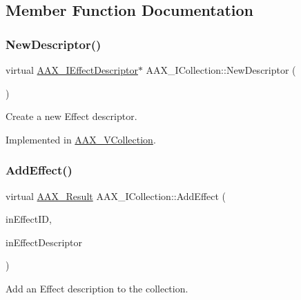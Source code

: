 \subsection{Member Function Documentation}
\mbox{\label{a01777_afab70588134a065a5b4d6ea6ddd5ddff}} 
\subsubsection{\texorpdfstring{NewDescriptor()}{NewDescriptor()}}
{\footnotesize\ttfamily virtual \mbox{\hyperlink{a01813}{A\+A\+X\+\_\+\+I\+Effect\+Descriptor}}$\ast$ A\+A\+X\+\_\+\+I\+Collection\+::\+New\+Descriptor (\begin{DoxyParamCaption}{ }\end{DoxyParamCaption})\hspace{0.3cm}{\ttfamily [pure virtual]}}



Create a new Effect descriptor. 



Implemented in \mbox{\hyperlink{a01897_a4f7845b62f8403ca700706500d54473b}{A\+A\+X\+\_\+\+V\+Collection}}.

\mbox{\label{a01777_a5ff114b8c4da2081515186f2faf65c8c}} 
\subsubsection{\texorpdfstring{AddEffect()}{AddEffect()}}
{\footnotesize\ttfamily virtual \mbox{\hyperlink{a00392_a4d8f69a697df7f70c3a8e9b8ee130d2f}{A\+A\+X\+\_\+\+Result}} A\+A\+X\+\_\+\+I\+Collection\+::\+Add\+Effect (\begin{DoxyParamCaption}\item[{const char $\ast$}]{in\+Effect\+ID,  }\item[{\mbox{\hyperlink{a01813}{A\+A\+X\+\_\+\+I\+Effect\+Descriptor}} $\ast$}]{in\+Effect\+Descriptor }\end{DoxyParamCaption})\hspace{0.3cm}{\ttfamily [pure virtual]}}



Add an Effect description to the collection. 

